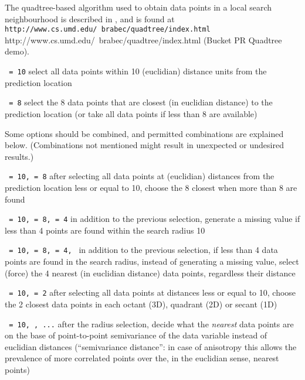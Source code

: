 \documentclass[a4paper,12pt]{book}
\renewcommand{\cite}{\citet}
\newcommand{\code}[1]{\texttt{#1}}
\newcommand{\iskey}[1]{\htmlref{\code{{#1}}}{key:#1}}
\newenvironment{codelist}{%
\begin{description}\setlength{\labelsep}{0.5cm}}{%
\end{description}}
\begin{document}
The quadtree-based algorithm used to obtain data
points in a local search neighbourhood is described in
\cite{hjaltason95}, and is found at \htmladdnormallink
{\code{http://www.cs.umd.edu/~brabec/quadtree/index.html}}
{http://www.cs.umd.edu/~brabec/quadtree/index.html}
(Bucket PR Quadtree demo).

\begin{codelist}
\item[\code{\iskey{radius} = 10}]
select all data points within 10 (euclidian) distance units from the
prediction location
\item[\code{\iskey{max} = 8}]
select the 8 data points that are closest (in euclidian distance) to the
prediction location (or take all data points if less than 8 are available)
\end{codelist}

\noindent
Some options should be combined, and permitted combinations are
explained below. (Combinations not mentioned might result in unexpected
or undesired results.)

\begin{codelist}
\item[\code{\iskey{radius} = 10, \iskey{max} = 8}]
after selecting all data points at
(euclidian) distances from the prediction location less or equal to 10,
choose the 8 closest when more than 8 are found
\item[\code{\iskey{radius} = 10, \iskey{max} = 8, \iskey{min} = 4}]
in addition to the previous selection, generate a missing value if less
than 4 points are found within the search radius 10
\item[\code{\iskey{radius} = 10, \iskey{max} = 8, \iskey{min} = 4,
\iskey{force}}]
in addition to the previous selection, if less than 4 data
points are found in the search radius, instead of generating a missing
value, select (force) the 4 nearest (in euclidian distance) data points,
regardless their distance
\item[\code{\iskey{radius} = 10, \iskey{omax} = 2}]
after selecting all data points at distances 
less or equal to 10, choose the 2 closest data points in each
octant (3D), quadrant (2D) or secant (1D)
\item[\code{\iskey{radius} = 10, \iskey{vdist}, ...}]
after the radius selection, decide what the {\em nearest} data points
are on the base of point-to-point semivariance of the data variable
instead of euclidian distances (``semivariance distance'': in case of
anisotropy this allows the prevalence of more correlated points over
the, in the euclidian sense, nearest points)
\end{codelist}
\end{document}
